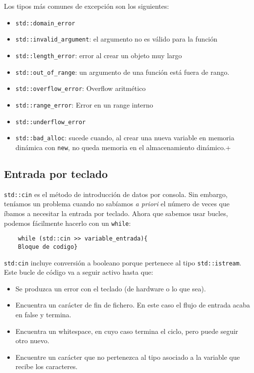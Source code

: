 \documentclass[a4paper]{article}
\begin{document}
	Los tipos más comunes de excepción son los siguientes:
	\begin{itemize}
		\item \verb|std::domain_error|
		\item \verb|std::invalid_argument|: el argumento no es válido para la función
		\item \verb|std::length_error|: error al crear un objeto muy largo
		\item \verb|std::out_of_range|: un argumento de una función está fuera de rango.
		\item \verb|std::overflow_error|: Overflow aritmético
		\item \verb|std::range_error|: Error en un range interno
		\item \verb|std::underflow_error|
		\item \verb|std::bad_alloc|: sucede cuando, al crear una nueva variable en memoria dinámica con \verb|new|, no queda memoria en el almacenamiento dinámico.+
	\end{itemize}
	
	\subsection{Entrada por teclado}
	\verb|std::cin| es el método de introducción de datos por consola. Sin embargo, teníamos un problema cuando no sabíamos \textit{a priori} el número de veces que íbamos a necesitar la entrada por teclado. Ahora que sabemos usar bucles, podemos fácilmente hacerlo con un \verb|while|:
	\begin{lstlisting}
	while (std::cin >> variable_entrada){
	Bloque de codigo}
	\end{lstlisting}
	
	\verb|std:cin| incluye conversión a booleano porque pertenece al tipo \verb|std::istream|. Este bucle de código va a seguir activo hasta que:
	\begin{itemize}
		\item Se produzca un error con el teclado (de hardware o lo que sea).
		\item Encuentra un carácter de fin de fichero. En este caso el flujo de entrada acaba en false y termina.
		\item Encuentra un whitespace, en cuyo caso termina el ciclo, pero puede seguir otro nuevo.
		\item Encuentre un carácter que no pertenezca al tipo asociado a la variable que recibe los caracteres.
	\end{itemize}
	
\end{document}
